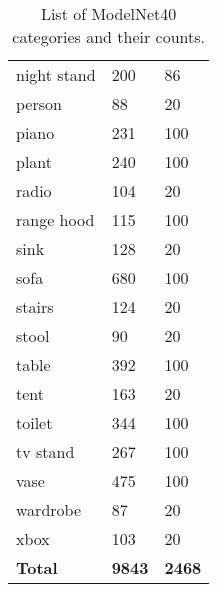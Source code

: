 \begin{table}[]
\begin{tabular}[t]{lll}
		night stand       & 200            & 86            \\
		person            & 88             & 20            \\
		piano             & 231            & 100           \\
		plant             & 240            & 100           \\
		radio             & 104            & 20            \\
		range hood        & 115            & 100           \\
		sink              & 128            & 20            \\
		sofa              & 680            & 100           \\
		stairs            & 124            & 20            \\
		stool             & 90             & 20            \\
		table             & 392            & 100           \\
		tent              & 163            & 20            \\
		toilet            & 344            & 100           \\
		tv stand          & 267            & 100           \\
		vase              & 475            & 100           \\
		wardrobe          & 87             & 20            \\
		xbox              & 103            & 20            \\
		\textbf{Total}    & \textbf{9843 } & \textbf{2468}
	\end{tabular}
	
	
	\caption{List of ModelNet40 categories and their counts.}
	\label{Table:modelnetcats}
\end{table}